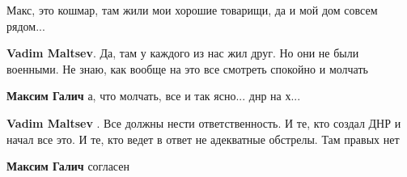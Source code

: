 \begin{cmtlist}
 
Макс, это кошмар, там жили мои хорошие товарищи, да и мой дом совсем рядом...

\begin{cmtlist}
 
\textbf{Vadim Maltsev}. Да, там у каждого из нас жил друг. Но они не были военными. Не знаю, как вообще на это все смотреть спокойно и молчать

 
\textbf{Максим Галич} а, что молчать, все и так ясно... днр на х...

 
\textbf{Vadim Maltsev} . Все должны нести ответственность. И те, кто создал ДНР и начал все это. И те, кто ведет в ответ не адекватные обстрелы. Там правых нет

 
\textbf{Максим Галич} согласен

 


\end{cmtlist}
\end{cmtlist}
